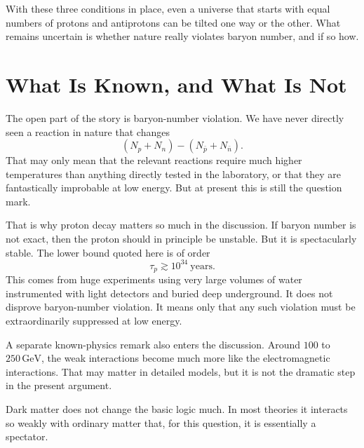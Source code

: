 With these three conditions in place, even a universe that starts with equal numbers of protons and antiprotons can be tilted one way or the other. What remains uncertain is whether nature really violates baryon number, and if so how.

\section{What Is Known, and What Is Not}

The open part of the story is baryon-number violation. We have never directly seen a reaction in nature that changes
\[
(N_p+N_n)-(N_{\bar p}+N_{\bar n}).
\]
That may only mean that the relevant reactions require much higher temperatures than anything directly tested in the laboratory, or that they are fantastically improbable at low energy. But at present this is still the question mark.

That is why proton decay matters so much in the discussion. If baryon number is not exact, then the proton should in principle be unstable. But it is spectacularly stable. The lower bound quoted here is of order
\[
\tau_p \gtrsim 10^{34}\ \text{years}.
\]
This comes from huge experiments using very large volumes of water instrumented with light detectors and buried deep underground. It does not disprove baryon-number violation. It means only that any such violation must be extraordinarily suppressed at low energy.

A separate known-physics remark also enters the discussion. Around \(100\) to \(250\,\mathrm{GeV}\), the weak interactions become much more like the electromagnetic interactions. That may matter in detailed models, but it is not the dramatic step in the present argument.

Dark matter does not change the basic logic much. In most theories it interacts so weakly with ordinary matter that, for this question, it is essentially a spectator.

\begin{classroomqa}
\end{classroomqa}

